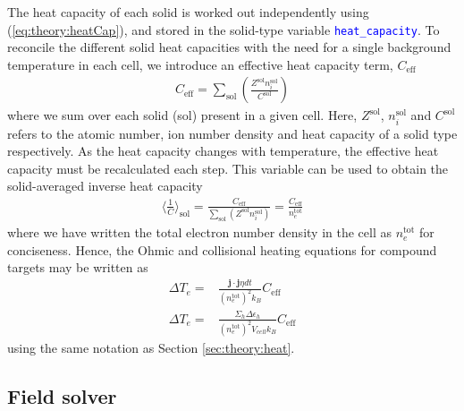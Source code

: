 \documentclass[12pt]{article}
\numberwithin{equation}{section}
\begin{document}
The heat capacity of each solid is worked out independently using (\ref{eq:theory:heatCap}), and stored in the solid-type variable \textcolor{blue}{\texttt{heat\_capacity}}. To reconcile the different solid heat capacities with the need for a single background temperature in each cell, we introduce an effective heat capacity term, $C_\text{eff}$
%
\begin{align}
  C_\text{eff} = \sum_\text{sol}\left(\frac{Z^{\text{sol}}n_i^{\text{sol}}}{C^{\text{sol}}}\right)
\end{align}
%
where we sum over each solid (sol) present in a given cell. Here, $Z^{\text{sol}}$, $n_i^\text{sol}$ and $C^{\text{sol}}$ refers to the atomic number, ion number density and heat capacity of a solid type respectively. As the heat capacity changes with temperature, the effective heat capacity must be recalculated each step. This variable can be used to obtain the solid-averaged inverse heat capacity
%
\begin{align} 
  \langle\frac{1}{C}\rangle_\text{sol} = \frac{C_\text{eff}}{\sum_\text{sol}\left(Z^{\text{sol}}n_i^{\text{sol}}\right)} = \frac{C_\text{eff}}{n_e^\text{tot}}
\end{align}
%
where we have written the total electron number density in the cell as $n_e^\text{tot}$ for conciseness. Hence, the Ohmic and collisional heating equations for compound targets may be written as
%
\begin{align}
  \Delta T_e =& \frac{\textbf{j}\cdot\textbf{j}\eta dt}{(n_e^\text{tot})^2k_B}C_\text{eff} \\
  \Delta T_e =& \frac{\Sigma_h \Delta \epsilon_h}{(n_e^\text{tot})^2V_{cell}k_B}C_\text{eff}
\end{align}
%
using the same notation as Section \ref{sec:theory:heat}.

\subsection{Field solver} \label{sec:code:fields}
\end{document}
